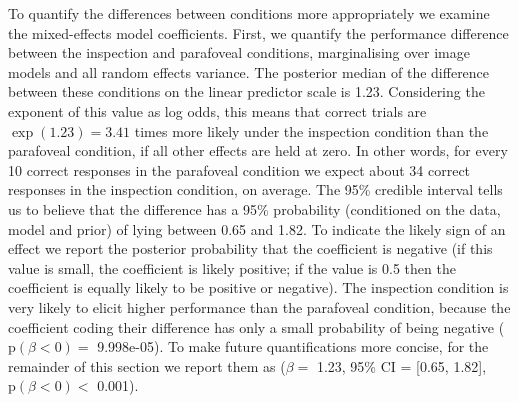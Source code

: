 \documentclass[doc, 11pt,a4paper,natbib]{apa6}\usepackage[]{graphicx}\usepackage[]{color}
\begin{document}
To quantify the differences between conditions more appropriately we examine the mixed-effects model coefficients. 
First, we quantify the performance difference between the inspection and parafoveal conditions, marginalising over image models and all random effects variance.
The posterior median of the difference between these conditions on the linear predictor scale is 1.23. %
Considering the exponent of this value as log odds, this means that correct trials are $\exp(1.23) = 3.41$ times more likely under the inspection condition than the parafoveal condition, if all other effects are held at zero.
In other words, for every 10 correct responses in the parafoveal condition we expect about 34 correct responses in the inspection condition, on average.
The 95\% credible interval tells us to believe that the difference has a 95\% probability (conditioned on the data, model and prior) of lying between 
0.65 and
1.82.
To indicate the likely sign of an effect we report the posterior probability that the coefficient is negative (if this value is small, the coefficient is likely positive; if the value is 0.5 then the coefficient is equally likely to be positive or negative).
The inspection condition is very likely to elicit higher performance than the parafoveal condition, because the coefficient coding their difference has only a small probability of being negative ($\mathrm{p}(\beta < 0) = $ 
9.998e-05).
To make future quantifications more concise, for the remainder of this section we report them as 
($\beta = $ 1.23, 95\% CI = [0.65, 1.82], $\mathrm{p}(\beta < 0) < $ 0.001).
\end{document}
